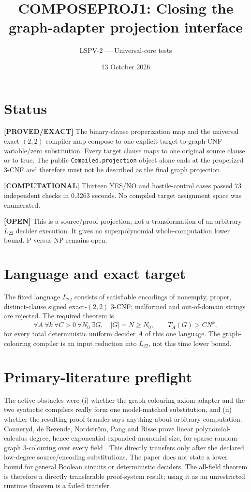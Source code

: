 \documentclass[11pt]{article}
\title{COMPOSEPROJ1: Closing the graph-adapter projection interface}
\author{LSPV-2 --- Universal-core tests}
\date{13 October 2026}
\newcommand{\status}[1]{\textbf{[#1]}}
\begin{document}
\maketitle

\section*{Status}
\status{PROVED/EXACT} The binary-clause properization map and the universal
exact-$(2,2)$ compiler map compose to one explicit target-to-graph-CNF
variable/zero substitution.  Every target clause maps to one original source
clause or to true.  The public \texttt{Compiled.projection} object alone ends at
the properized 3-CNF and therefore must not be described as the final graph
projection.

\status{COMPUTATIONAL} Thirteen YES/NO and hostile-control cases passed 73
independent checks in 0.3263 seconds.  No compiled target assignment space was
enumerated.

\status{OPEN} This is a source/proof projection, not a transformation of an
arbitrary $L_{22}$ decider execution.  It gives no superpolynomial
whole-computation lower bound.  P versus NP remains open.

\section{Language and exact target}
The fixed language $L_{22}$ consists of satisfiable encodings of nonempty,
proper, distinct-clause signed exact-$(2,2)$ 3-CNF; malformed and out-of-domain
strings are rejected.  The required theorem is
\[
\forall A\ \forall k\ \forall C>0\ \forall N_0\ \exists G,\quad
|G|=N\ge N_0,\qquad T_A(G)>CN^k ,
\]
for every total deterministic uniform decider $A$ of this one language.
The graph-colouring compiler is an input reduction into $L_{22}$, not this
time lower bound.

\section{Primary-literature preflight}
The active obstacles were (i) whether the graph-colouring axiom adapter and the
two syntactic compilers really form one model-matched substitution, and (ii)
whether the resulting proof transfer says anything about arbitrary computation.
Conneryd, de Rezende, Nordstr\"om, Pang and Risse prove linear polynomial-calculus
degree, hence exponential expanded-monomial size, for sparse random graph
3-colouring over every field \cite{conneryd}.  This directly transfers only
after the declared low-degree source/encoding substitutions.  The paper does
not state a lower bound for general Boolean circuits or deterministic deciders.
The all-field theorem is therefore a directly transferable proof-system result;
using it as an unrestricted runtime theorem is a failed transfer.
\end{document}
